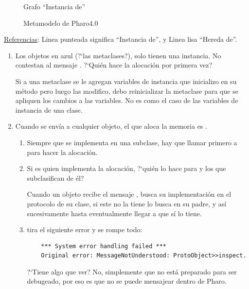 \begin{figure}[H]
\begin{minipage}{.5\textwidth}
  \caption{Grafo ``Instancia de''}
  \label{fig:sub2}
\end{minipage}
\caption{Metamodelo de Pharo4.0}
\label{fig:test}
\end{figure}

\underline{Referencias}: Linea punteada significa ``Instancia de'', y Linea lisa ``Hereda de''.

\begin{enumerate}
 \item Los objetos en azul (?`las metaclases?), solo tienen una instancia. No contestan al mensaje . ?`Qui\'en hace la alocaci\'on por primera vez? 
 
 Si a una metaclase se le agregan variables de instancia que inicializo en su m\'etodo  pero luego las modifico, debo reinicializar la metaclase para que se apliquen los cambios a las variables. No es como el caso de las variables de instancia de una clase. 
 
 \item Cuando se env\'ia  a cualquier objeto, el que aloca la memoria es . 
  \begin{enumerate}
    \item Siempre que se implementa  en una subclase, hay que llamar primero a  para hacer la alocaci\'on. 
    
    \item Si es  quien implementa la alocaci\'on, ?`qui\'en lo hace para  y los que subclasifican de \'el? 
    
    Cuando un objeto recibe el mensaje , busca su implementaci\'on en el protocolo de su clase, si este no la tiene lo busca en su padre, y as\'i sucesivamente hasta eventualmente llegar a  que s\'i lo tiene. 
    
    \item {} tira el siguiente error y se rompe todo: 

	\begin{verbatim}
	*** System error handling failed ***
	Original error: MessageNotUnderstood: ProtoObject>>inspect.
	\end{verbatim}

	?`Tiene algo que ver? No, simplemente que  no est\'a preparado para ser debugeado, por eso es que no se puede mensajear dentro de Pharo. 
    
  \end{enumerate}


\end{enumerate}
